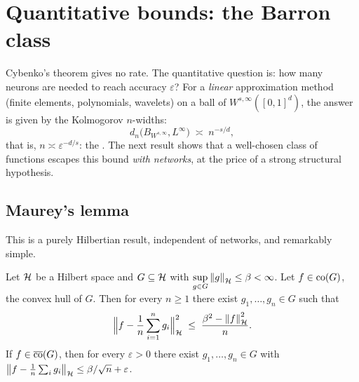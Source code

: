 \documentclass[11pt,a4paper]{article}
\begin{document}
\section{Quantitative bounds: the Barron class}

Cybenko's theorem gives no rate. The quantitative question is: how many neurons are needed to reach
accuracy $\varepsilon$? For a \emph{linear} approximation method (finite elements, polynomials,
wavelets) on a ball of $W^{s,\infty}([0,1]^d)$, the answer is given by the Kolmogorov $n$-widths:
\begin{equation}\label{eq:kolm}
d_n\big( B_{W^{s,\infty}}, L^\infty \big) \;\asymp\; n^{-s/d},
\end{equation}
that is, $n \asymp \varepsilon^{-d/s}$: the . The next result shows
that a well-chosen class of functions escapes this bound \emph{with networks}, at the price of a
strong structural hypothesis.

\subsection{Maurey's lemma}

This is a purely Hilbertian result, independent of networks, and remarkably simple.

\begin{lemma}\label{lem:maurey}
Let $\mathcal{H}$ be a Hilbert space and $G \subseteq \mathcal{H}$ with
$\displaystyle\sup_{g \in G} \left\lVert g \right\rVert_{\mathcal{H}} \le \beta < \infty$. Let $f \in \operatorname{co}(G)$, the convex hull
of $G$. Then for every $n \ge 1$ there exist $g_1,\dots,g_n \in G$ such that
\[
\Big\| f - \frac1n \sum_{i=1}^n g_i \Big\|_{\mathcal{H}}^2 \;\le\; \frac{\beta^2 - \left\lVert f \right\rVert_{\mathcal{H}}^2}{n} .
\]
If $f \in \overline{\operatorname{co}}(G)$, then for every $\varepsilon > 0$ there exist $g_1,\dots,g_n \in G$
with $\left\lVert f - \frac1n\sum_i g_i \right\rVert_{\mathcal{H}} \le \beta/\sqrt{n} + \varepsilon$.
\end{lemma}
\end{document}
